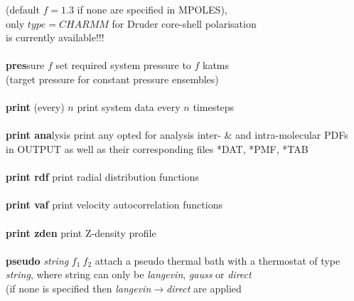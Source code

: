 \begin{tabbing}
\>                                              \> (default $f=1.3$ if none are specified in MPOLES), \\
\>                                              \> only $type=CHARMM$ for Druder core-shell polarisation \\
\>                                              \> is currently available!!! \\
\>                                              \> \\
\> {\bf pres}sure $f$                           \> set required system pressure to $f$ katms \\
\>                                              \> (target pressure for constant pressure ensembles) \\
\>                                              \> \\
\> {\bf print} (every) $n$                      \> print system data every $n$ timesteps \\
\>                                              \> \\
\> {\bf print ana}lysis                         \> print any opted for analysis inter- \& and intra-molecular PDFs \\
\>                                              \> in OUTPUT as well as their corresponding files *DAT, *PMF, *TAB \\
\>                                              \> \\
\> {\bf print rdf}                              \> print radial distribution functions \\
\>                                              \> \\
\> {\bf print vaf}                              \> print velocity autocorrelation functions \\
\>                                              \> \\
\> {\bf print zden}                             \> print Z-density profile \\
\>                                              \> \\
\> {\bf pseudo} {\em string} $f_{1}~f_{2}$      \> attach a pseudo thermal bath with a thermostat of type \\
\>                                              \> {\em string}, where string can only be {\em langevin}, {\em gauss} or {\em direct} \\
\>                                              \> (if none is specified then {\em langevin$\rightarrow$direct} are applied \\

\end{tabbing}
